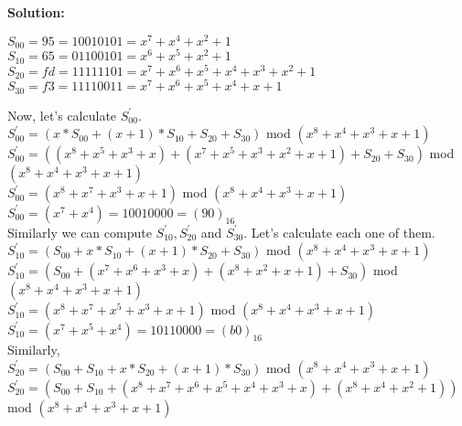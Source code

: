 \documentclass[11pt]{article}
\begin{document}
\textbf{Solution:}
\begin{center}
    $S_{00} = 95 = 10010101 = x^7 + x^4 + x^2 + 1$\\
    $S_{10} = 65 = 01100101 = x^6 + x^5 + x^2 + 1$\\
    $S_{20} = fd = 11111101 = x^7 + x^6 + x^5 + x^4 + x^3 + x^2 + 1$\\
    $S_{30} = f3 = 11110011 = x^7 + x^6 + x^5 + x^4 + x + 1$\\
\end{center}
Now, let's calculate $S_{00}^{'}$.\\
\newline
$S_{00}^{'} = (x * S_{00} + (x+1) * S_{10} + S_{20} + S_{30})$ mod $(x^8 + x^4 + x^3 + x + 1)$\\
\newline
$S_{00}^{'} = ((x^8 + x^5 + x^3 + x) + (x^7 + x^5 + x^3 + x^2 + x + 1) + S_{20} + S_{30})$ mod $(x^8 + x^4 + x^3 + x + 1)$\\
\newline
$S_{00}^{'} = (x^8 + x^7 + x^3 + x + 1)$ mod $(x^8 + x^4 + x^3 + x + 1)$\\
\newline
$S_{00}^{'} = (x^7 + x^4) = 10010000 = (90)_{16}$\\
\newline
Similarly we can compute $S_{10}^{'}, S_{20}^{'}$ and $S_{30}^{'}$. Let's calculate each one of them.\\
\newline
    $S_{10}^{'} = (S_{00} + x * S_{10} + (x + 1) * S_{20} + S_{30})$ mod $(x^8 + x^4 + x^3 + x + 1)$\\
    \newline
    $S_{10}^{'} = (S_{00} + (x^7 + x^6 + x^3 + x) + (x^8 + x^2 + x + 1) + S_{30})$ mod $(x^8 + x^4 + x^3 + x + 1)$\\
    \newline
    $S_{10}^{'} = (x^8 + x^7 + x^5 + x^3 + x + 1)$ mod $(x^8 + x^4 + x^3 + x + 1)$\\
    \newline
    $S_{10}^{'} = (x^7 + x^5 + x^4) = 10110000 = (b0)_{16}$\\
\newline
Similarly, \\
\newline
    $S_{20}^{'} = (S_{00} + S_{10} + x * S_{20} + (x+1) * S_{30})$ mod $(x^8 + x^4 + x^3 + x + 1)$\\
    \newline
    $S_{20}^{'} = (S_{00} + S_{10} + (x^8 + x^7 + x^6 + x^5 + x^4 + x^3 + x) + (x^8 + x^4 + x^2 + 1))$ mod $(x^8 + x^4 + x^3 + x + 1)$\\
\end{document}
